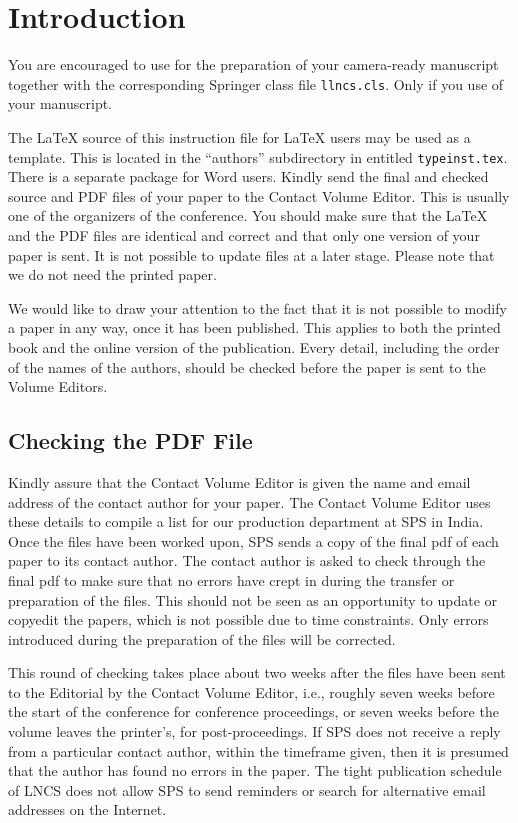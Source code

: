 \section{Introduction}


You are encouraged to use \LaTeXe{} for the
preparation of your camera-ready manuscript together with the
corresponding Springer class file \verb+llncs.cls+. Only if you use
of your manuscript.


The \LaTeX{} source of this instruction file for \LaTeX{} users may be
used as a template. This is
located in the ``authors'' subdirectory in
entitled \texttt{typeinst.tex}. There is a separate package for Word 
users. Kindly send the final and checked source
and PDF files of your paper to the Contact Volume Editor. This is
usually one of the organizers of the conference. You should make sure
that the \LaTeX{} and the PDF files are identical and correct and that
only one version of your paper is sent. It is not possible to update
files at a later stage. Please note that we do not need the printed
paper.


We would like to draw your attention to the fact that it is not possible
to modify a paper in any way, once it has been published. This applies
to both the printed book and the online version of the publication.
Every detail, including the order of the names of the authors, should
be checked before the paper is sent to the Volume Editors.


\subsection{Checking the PDF File}


Kindly assure that the Contact Volume Editor is given the name and email
address of the contact author for your paper. The Contact Volume Editor
uses these details to compile a list for our production department at
SPS in India. Once the files have been worked upon, SPS sends a copy of
the final pdf of each paper to its contact author. The contact author is
asked to check through the final pdf to make sure that no errors have
crept in during the transfer or preparation of the files. This should
not be seen as an opportunity to update or copyedit the papers, which is
not possible due to time constraints. Only errors introduced during the
preparation of the files will be corrected.


This round of checking takes place about two weeks after the files have
been sent to the Editorial by the Contact Volume Editor, i.e., roughly
seven weeks before the start of the conference for conference
proceedings, or seven weeks before the volume leaves the printer's, for
post-proceedings. If SPS does not receive a reply from a particular
contact author, within the timeframe given, then it is presumed that the
author has found no errors in the paper. The tight publication schedule
of LNCS does not allow SPS to send reminders or search for alternative
email addresses on the Internet.



